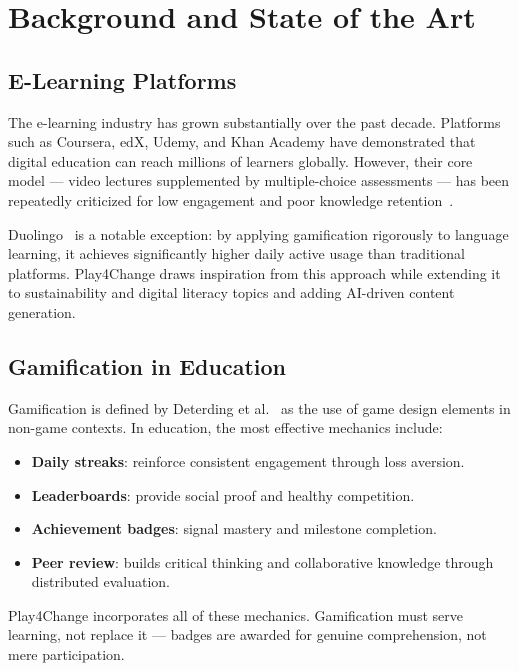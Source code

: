%
%
\chapter{Background and State of the Art}
\label{cha:background}

\section{E-Learning Platforms}
\label{sec:elearning}

The e-learning industry has grown substantially over the past decade. Platforms such as Coursera, edX, Udemy, and Khan Academy have demonstrated that digital education can reach millions of learners globally. However, their core model — video lectures supplemented by multiple-choice assessments — has been repeatedly criticized for low engagement and poor knowledge retention~\cite{jordan2014initial}.

Duolingo~\cite{vesselinov2012duolingo} is a notable exception: by applying gamification rigorously to language learning, it achieves significantly higher daily active usage than traditional platforms. Play4Change draws inspiration from this approach while extending it to sustainability and digital literacy topics and adding AI-driven content generation.

\section{Gamification in Education}
\label{sec:gamification}

Gamification is defined by Deterding et al.~\cite{deterding2011game} as the use of game design elements in non-game contexts. In education, the most effective mechanics include:

\begin{itemize}
    \item \textbf{Daily streaks}: reinforce consistent engagement through loss aversion.
    \item \textbf{Leaderboards}: provide social proof and healthy competition.
    \item \textbf{Achievement badges}: signal mastery and milestone completion.
    \item \textbf{Peer review}: builds critical thinking and collaborative knowledge through distributed evaluation.
\end{itemize}

Play4Change incorporates all of these mechanics. Gamification must serve learning, not replace it — badges are awarded for genuine comprehension, not mere participation.

